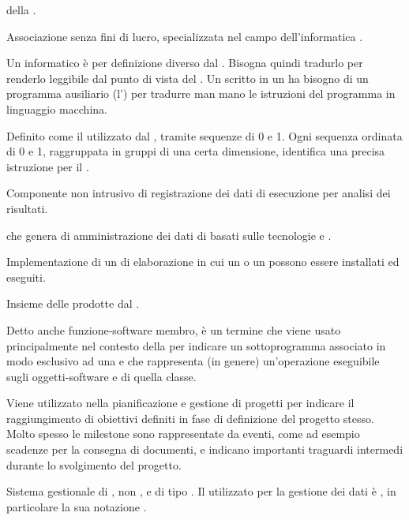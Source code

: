 { della .}


{Associazione senza fini di lucro, specializzata nel campo dell'informatica .}


{Un  informatico è per definizione diverso dal . Bisogna quindi tradurlo per renderlo leggibile dal punto di vista del . Un  scritto in un  ha bisogno di un programma ausiliario (l') per tradurre man mano le istruzioni del programma in linguaggio macchina.}


{Definito come il  utilizzato dal , tramite sequenze di 0 e 1. Ogni sequenza ordinata di 0 e 1, raggruppata in gruppi di una certa dimensione, identifica una precisa istruzione per il .}


{Componente non intrusivo di registrazione dei dati di esecuzione per analisi dei risultati.}






{ che genera   di amministrazione dei dati di  basati sulle tecnologie e .}

{Implementazione  di un  di elaborazione in cui un  o un  possono essere installati ed eseguiti.}


{Insieme delle  prodotte dal  .}


{Detto anche funzione-software membro, è un termine che viene usato principalmente nel contesto della   per indicare un sottoprogramma associato in modo esclusivo ad una  e che rappresenta (in genere) un'operazione eseguibile sugli oggetti-software e  di quella classe.}


{Viene utilizzato nella pianificazione e gestione di progetti per indicare il raggiungimento di obiettivi definiti in fase di definizione del progetto stesso. Molto spesso le milestone sono rappresentate da eventi, come ad esempio scadenze per la consegna di documenti, e indicano importanti traguardi intermedi durante lo svolgimento del progetto.}


{Sistema gestionale di , non ,  e di tipo . Il  utilizzato per la gestione dei dati è , in particolare la sua notazione .}

